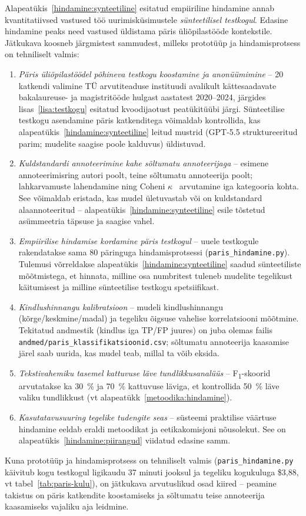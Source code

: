Alapeatükis~\ref{hindamine:synteetiline} esitatud empiiriline hindamine annab kvantitatiivsed vastused töö uurimisküsimustele \emph{sünteetilisel testkogul}. Edasine hindamine peaks need vastused üldistama päris üliõpilastööde kontekstile. Jätkukava koosneb järgmistest sammudest, milleks prototüüp ja hindamisprotsess on tehniliselt valmis:

\begin{enumerate}
    \item \emph{Päris üliõpilastöödel põhineva testkogu koostamine ja anonüümimine} -- 20 katkendi valimine TÜ arvutiteaduse instituudi avalikult kättesaadavate bakalaureuse- ja magistritööde hulgast aastatest 2020--2024, järgides lisas~\ref{lisa:testkogu} esitatud kvoodijaotust peatükitüübi järgi. Sünteetilise testkogu asendamine päris katkenditega võimaldab kontrollida, kas alapeatükis~\ref{hindamine:synteetiline} leitud mustrid (GPT-5.5 struktureeritud parim; mudelite saagise poole kalduvus) üldistuvad.
    \item \emph{Kuldstandardi annoteerimine kahe sõltumatu annoteerijaga} -- esimene annoteerimisring autori poolt, teine sõltumatu annoteerija poolt; lahkarvamuste lahendamine ning Coheni $\kappa$~\cite{cohen_kappa_1960} arvutamine iga kategooria kohta. See võimaldab eristada, kas mudel ületuvastab või on kuldstandard alaannoteeritud -- alapeatükis~\ref{hindamine:synteetiline} esile tõstetud asümmeetria täpsuse ja saagise vahel.
    \item \emph{Empiirilise hindamise kordamine päris testkogul} -- uuele testkogule rakendatakse sama 80 päringuga hindamisprotsessi (\texttt{paris\_hindamine.py}). Tulemusi võrreldakse alapeatükis~\ref{hindamine:synteetiline} saadud sünteetiliste mõõtmistega, et hinnata, milline osa numbritest tuleneb mudelite tegelikust käitumisest ja milline sünteetilise testkogu spetsiifikast.
    \item \emph{Kindlushinnangu kalibratsioon} -- mudeli kindlushinnangu (kõrge/keskmine/madal) ja tegeliku õigsuse vahelise korrelatsiooni mõõtmine. Tekitatud andmestik (kindlus iga TP/FP juures) on juba olemas failis \texttt{andmed/paris\_klassifikatsioonid.csv}; sõltumatu annoteerija kaasamise järel saab uurida, kas mudel teab, millal ta võib eksida.
    \item \emph{Tekstivahemiku tasemel kattuvuse läve tundlikkusanalüüs} -- F\textsubscript{1}-skoorid arvutatakse ka 30~\% ja 70~\% kattuvuse läviga, et kontrollida 50~\% läve valiku tundlikkust (vt alapeatükk~\ref{metoodika:hindamine}).
    \item \emph{Kasutatavusuuring tegelike tudengite seas} -- süsteemi praktilise väärtuse hindamine eeldab eraldi metoodikat ja eetikakomisjoni nõusolekut. See on alapeatükis~\ref{hindamine:piirangud} viidatud edasine samm.
\end{enumerate}

Kuna prototüüp ja hindamisprotsess on tehniliselt valmis (\texttt{paris\_hindamine.py} käivitub kogu testkogul ligikaudu 37 minuti jooksul ja tegeliku kogukuluga \$3{,}88, vt tabel~\ref{tab:paris-kulu}), on jätkukava arvutuslikud osad kiired -- peamine takistus on päris katkendite koostamiseks ja sõltumatu teise annoteerija kaasamiseks vajaliku aja leidmine.
